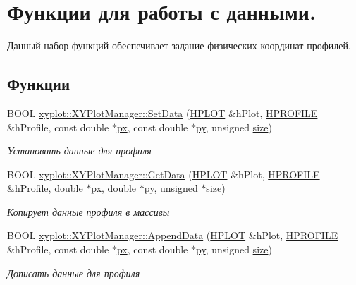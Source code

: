 \hypertarget{group__gr_output_data}{\section{Функции для работы с данными.}
\label{group__gr_output_data}
}


Данный набор функций обеспечивает задание физических координат профилей.  


\subsection*{Функции}
\begin{DoxyCompactItemize}
\item 
B\-O\-O\-L \hyperlink{group__gr_output_data_ga95d2b2960c45eb6368a9d1039bacdc0d}{xyplot\-::\-X\-Y\-Plot\-Manager\-::\-Set\-Data} (\hyperlink{classxyplot_1_1_h_p_l_o_t}{H\-P\-L\-O\-T} \&h\-Plot, \hyperlink{classxyplot_1_1_h_p_r_o_f_i_l_e}{H\-P\-R\-O\-F\-I\-L\-E} \&h\-Profile, const double $\ast$\hyperlink{namespacexyplot_aa88522a2f4371e38891cac7b5bc3e4aa}{px}, const double $\ast$\hyperlink{namespacexyplot_adc56454d6bac520db8907c6a206d3040}{py}, unsigned \hyperlink{namespacexyplot_a0e8516aaf446c174c28a4327a27dd9ce}{size})
\begin{DoxyCompactList}\small\item\em Установить данные для профиля \end{DoxyCompactList}\item 
B\-O\-O\-L \hyperlink{group__gr_output_data_ga6557de664a4b3b7fb8fd7ab2c9d736b9}{xyplot\-::\-X\-Y\-Plot\-Manager\-::\-Get\-Data} (\hyperlink{classxyplot_1_1_h_p_l_o_t}{H\-P\-L\-O\-T} \&h\-Plot, \hyperlink{classxyplot_1_1_h_p_r_o_f_i_l_e}{H\-P\-R\-O\-F\-I\-L\-E} \&h\-Profile, double $\ast$\hyperlink{namespacexyplot_aa88522a2f4371e38891cac7b5bc3e4aa}{px}, double $\ast$\hyperlink{namespacexyplot_adc56454d6bac520db8907c6a206d3040}{py}, unsigned $\ast$\hyperlink{namespacexyplot_a0e8516aaf446c174c28a4327a27dd9ce}{size})
\begin{DoxyCompactList}\small\item\em Копирует данные профиля в массивы \end{DoxyCompactList}\item 
B\-O\-O\-L \hyperlink{group__gr_output_data_ga21b8bd6024247b085e6c047ce4f6e763}{xyplot\-::\-X\-Y\-Plot\-Manager\-::\-Append\-Data} (\hyperlink{classxyplot_1_1_h_p_l_o_t}{H\-P\-L\-O\-T} \&h\-Plot, \hyperlink{classxyplot_1_1_h_p_r_o_f_i_l_e}{H\-P\-R\-O\-F\-I\-L\-E} \&h\-Profile, const double $\ast$\hyperlink{namespacexyplot_aa88522a2f4371e38891cac7b5bc3e4aa}{px}, const double $\ast$\hyperlink{namespacexyplot_adc56454d6bac520db8907c6a206d3040}{py}, unsigned \hyperlink{namespacexyplot_a0e8516aaf446c174c28a4327a27dd9ce}{size})
\begin{DoxyCompactList}\small\item\em Дописать данные для профиля \end{DoxyCompactList}\end{DoxyCompactItemize}


